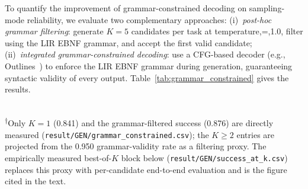 \documentclass[a4paper,fleqn,longmktitle]{cas-dc}
\begin{document}
To quantify the improvement of grammar-constrained decoding on sampling-mode reliability, we evaluate two complementary approaches: (i)~\emph{post-hoc grammar filtering}: generate $K=5$ candidates per task at temperature,=,1.0, filter using the LIR EBNF grammar, and accept the first valid candidate; (ii)~\emph{integrated grammar-constrained decoding}: use a CFG-based decoder (e.g., Outlines~\citep{outlines}) to enforce the LIR EBNF grammar during generation, guaranteeing syntactic validity of every output. Table~\ref{tab:grammar_constrained} gives the results.

\begin{table}[t]
\centering
\caption{Grammar-constrained decoding results (temperature,=,1.0, $K=5$, 113 tasks): measured post-hoc filtering and best-of-$K$ task success.}
\label{tab:grammar_constrained}
\footnotesize
{}\\[2pt]
{\footnotesize \textsuperscript{$\dagger$}Only $K{=}1$ (0.841) and the grammar-filtered success (0.876) are directly measured (\texttt{result/GEN/grammar\_constrained.csv}); the $K{\geq}2$ entries are projected from the 0.950 grammar-validity rate as a filtering proxy. The empirically measured best-of-$K$ block below (\texttt{result/GEN/success\_at\_k.csv}) replaces this proxy with per-candidate end-to-end evaluation and is the figure cited in the text.}
\end{table}
\end{document}
